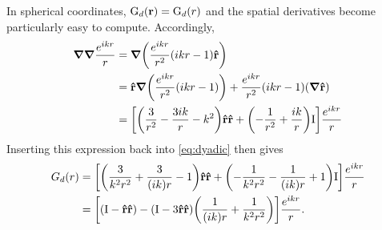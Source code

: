 In spherical coordinates, $\mathrm{G}_d(\vb{r}) = \mathrm{G}_d(r)$ and the spatial derivatives become particularly easy to compute.
Accordingly,
\begin{equation}
  \begin{aligned}
    \grad\grad \frac{e^{ikr}}{r} &= \grad \qty(\frac{e^{ikr}}{r^2}(ikr - 1) \vu{r}) \\
    &= \vu{r}\grad \qty(\frac{e^{ikr}}{r^2}(ikr - 1)) + \frac{e^{ikr}}{r^2}(ikr - 1)\qty(\grad \vu{r}) \\
    &= \qty[\qty(\frac{3}{r^2}-\frac{3 i k}{r}-k^2) \vu{r}\vu{r} + \qty(- \frac{1}{r^2} + \frac{ik}{r}) \mathrm{I}] \frac{e^{ikr}}{r}
  \end{aligned}
\end{equation}
Inserting this expression back into \cref{eq:dyadic} then gives
\begin{equation}
  \begin{aligned}
    G_d(r) & = \qty[\qty(\frac{3}{k^2 r^2}+\frac{3}{(i k) r}-1) \vu{r}\vu{r} + \qty(-\frac{1}{k^2r^2} - \frac{1}{(ik)r} + 1) \mathrm{I}] \frac{e^{ikr}}{r} \\
    & = \qty[ \qty(\mathrm{I} - \vu{r}\vu{r}) - \qty(\mathrm{I} - 3\vu{r}\vu{r})\qty(\frac{1}{(ik)r} + \frac{1}{k^2 r^2})] \frac{e^{ikr}}{r}.
  \end{aligned}
  \label{eq:expanded dyadic}
\end{equation}


